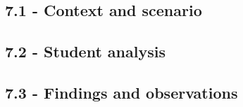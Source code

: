 \subsection{7.1 - Context and scenario}\label{context-and-scenario}

\subsection{7.2 - Student analysis}\label{student-analysis}

\subsection{7.3 - Findings and
observations}\label{findings-and-observations}
